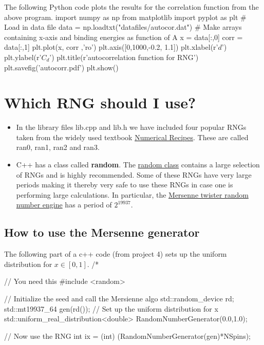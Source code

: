 \documentclass[%
oneside,                 %
final,                   %
10pt]{article}
\newenvironment{block_mdfboxadmon}[1][]{
\begin{block_mdfboxmdframed}[frametitle=#1]
}
{
\end{block_mdfboxmdframed}
}
\begin{document}
\begin{block_mdfboxadmon}[]
The following Python code plots the results for the correlation function from the above program.
\bpypro
import numpy as np
from  matplotlib import pyplot as plt
# Load in data file
data = np.loadtxt("datafiles/autocor.dat")
# Make arrays containing x-axis and binding energies as function of A
x = data[:,0]
corr = data[:,1]
plt.plot(x, corr ,'ro')
plt.axis([0,1000,-0.2, 1.1])
plt.xlabel(r'$d$')
plt.ylabel(r'$C_d$')
plt.title(r'autocorrelation function for RNG')
plt.savefig('autocorr.pdf')
plt.show()

\epypro
\end{block_mdfboxadmon} %





\section{Which RNG should I use?}

\begin{block_mdfboxadmon}[]
\begin{itemize}
\item In the library files lib.cpp and lib.h we have included four popular RNGs taken from the widely used textbook \href{{http://numerical.recipes/}}{Numerical Recipes}. These are called ran0, ran1, ran2 and ran3.

\item C++ has a class called \textbf{random}. The \href{{http://www.cplusplus.com/reference/random/}}{random class} contains a large selection of RNGs and is highly recommended. Some of these RNGs have very large periods making it thereby very safe to use these RNGs in case one is performing large calculations. In particular, the \href{{http://www.cplusplus.com/reference/random/mersenne_twister_engine/}}{Mersenne twister random number engine} has a period of $2^{19937}$. 
\end{itemize}

\noindent
\end{block_mdfboxadmon} %




\subsection{How to use the Mersenne generator}

\begin{block_mdfboxadmon}[]
The following part of a c++ code (from project 4) sets up the uniform distribution for $x\in [0,1]$. 
\bcppcod
/*

//  You need this 
#include <random>

// Initialize the seed and call the Mersienne algo
std::random_device rd;
std::mt19937_64 gen(rd());
// Set up the uniform distribution for x \in [[0, 1]
std::uniform_real_distribution<double> RandomNumberGenerator(0.0,1.0);

// Now use the RNG
int ix = (int) (RandomNumberGenerator(gen)*NSpins);
\ecppcod
\end{block_mdfboxadmon} %
\end{document}
